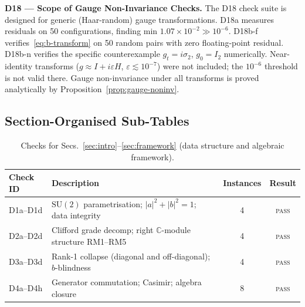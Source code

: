 \documentclass[12pt]{article}
\numberwithin{equation}{section}
\theoremstyle{plain}
\theoremstyle{definition}
\theoremstyle{remark}
\newcommand{\su}{\mathrm{SU}}              %
\newcommand{\Cplx}{\mathbb{C}}             %
\begin{document}
		\medskip\noindent
		\textbf{D18 --- Scope of Gauge Non-Invariance Checks.}
		The D18 check suite is designed for generic (Haar-random) gauge
		transformations.  D18a measures residuals on 50 configurations,
		finding min $1.07\times 10^{-2} \gg 10^{-6}$.  D18b-f
		verifies~\eqref{eq:b-transform} on 50 random pairs with zero
		floating-point residual.  D18b-n verifies the specific counterexample
		$g_t = i\sigma_{2}$, $g_0 = I_2$ numerically.  Near-identity
		transforms ($g\approx I + i\varepsilon H$,
		$\varepsilon\lesssim 10^{-7}$) were not included; the $10^{-6}$
		threshold is not valid there.  Gauge non-invariance under all
		transforms is proved analytically by
		Proposition~\ref{prop:gauge-noninv}.
		
		\subsection{Section-Organised Sub-Tables}
		\label{sec:subtables}
		
		\begin{table}[ht]
			\centering
			\caption{Checks for Secs.~\ref{sec:intro}--\ref{sec:framework}
				(data structure and algebraic framework).}
			\label{tab:checks-S1S2}
			\small
			\setlength{\tabcolsep}{6pt}
			\begin{tabular}{@{}lp{8cm}cc@{}}
				\toprule
				\textbf{Check ID} & \textbf{Description}
				& \textbf{Instances} & \textbf{Result}\\
				\midrule
				D1a--D1d  & $\su(2)$ parametrisation;
				$|a|^2 + |b|^2 = 1$; data integrity
				& 4 & \textsc{pass}\\
				D2a--D2d  & Clifford grade decomp; right
				$\Cplx$-module structure RM1--RM5
				& 4 & \textsc{pass}\\
				D3a--D3d  & Rank-1 collapse
				(diagonal and off-diagonal); $b$-blindness
				& 4 & \textsc{pass}\\
				D4a--D4h  & Generator commutation; Casimir; algebra closure
				& 8 & \textsc{pass}\\
				\bottomrule
			\end{tabular}
		\end{table}
		
\end{document}
